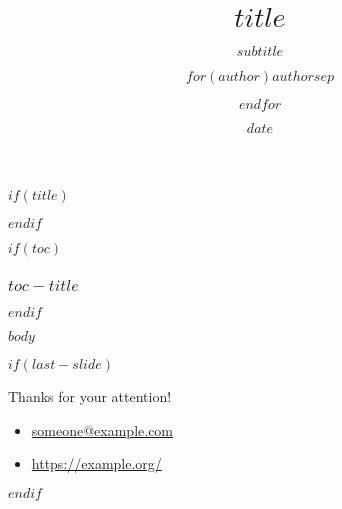 \documentclass[
  $if(fontsize)$
    $fontsize$,
  $endif$
  $if(handout)$
    handout,
  $endif$
  $if(aspectratio)$
    aspectratio = $aspectratio$,
  $endif$
]{beamer}
\title{$title$}
\subtitle{$subtitle$}
\author[$author-short$]{$for(author)$$author$$sep$ \and $endfor$}
\date{$date$}
\institute{$for(institute)$$institute$$sep$ \and $endfor$}
\begin{document}
$if(title)$
  \begin{frame}[plain]{}
    \titlepage
  \end{frame}
$endif$

$if(toc)$
  \begin{frame}
    \frametitle{$toc-title$}
    \tableofcontents
  \end{frame}
$endif$

$body$

$if(last-slide)$
  \begin{frame}{}
      \vspace{0.5cm}
      \begin{center}
          {\Large Thanks for your attention!}
      \end{center}
      \vfill
      \begin{itemize}
        \item[\faEnvelope] \href{mailto:someone@example.com}{someone@example.com} \\
        \item[\faLaptop] \href{https://example.org/}{https://example.org/}
      \end{itemize}
  \end{frame}
$endif$
\end{document}
